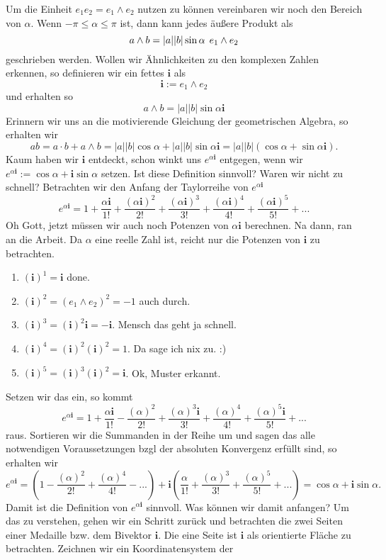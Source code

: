 \documentclass[fleqn]{scrartcl}
\numberwithin{equation}{section}
\def\*#1{\mathbf{#1}}
\begin{document}
Um die Einheit $e_1e_2 = e_1\wedge e_2$ nutzen zu können vereinbaren wir noch
den Bereich von $\alpha$. Wenn $-\pi\leq\alpha\leq\pi$ ist, dann kann jedes
äußere Produkt als
\[a\wedge b= |a||b|\sin\alpha \hspace{1ex} e_1\wedge e_2\]
geschrieben werden. Wollen wir Ähnlichkeiten zu den komplexen Zahlen erkennen,
so definieren wir ein fettes $\*i$ als
\[\*i:= e_1\wedge e_2\]
und erhalten so
\[a\wedge b= |a||b|\sin\alpha\*i\]
Erinnern wir uns an die motivierende Gleichung der geometrischen Algebra, so
erhalten wir
\[ab=a\cdot b + a\wedge b = |a||b|\cos\alpha + |a||b|\sin\alpha\*i =
|a||b|(\cos\alpha + \sin\alpha\*i).\]
Kaum haben wir $\*i$ entdeckt, schon winkt uns $e^{\alpha\*i}$ entgegen, wenn
wir $e^{\alpha\*i} := \cos\alpha + \*i\sin\alpha$ setzen. Ist diese Definition
sinnvoll? Waren wir nicht zu schnell? Betrachten wir den Anfang der
Taylorreihe von $e^{\alpha\*i}$
\[e^{\alpha\*i}=1+\frac{\alpha\*i}{1!}+\frac{(\alpha\*i)^2}{2!}
+\frac{(\alpha\*i)^3}{3!}+\frac{(\alpha\*i)^4}{4!}+\frac{(\alpha\*i)^5}{5!}+ ...\]
Oh Gott, jetzt müssen wir auch noch Potenzen von $\alpha\*i$ berechnen. Na
dann, ran an die Arbeit. Da $\alpha$ eine reelle Zahl ist, reicht nur die
Potenzen von $\*i$ zu betrachten.
\begin{enumerate}
    \item $(\*i)^1=\*i$ done.
    \item $(\*i)^2=(e_1\wedge e_2)^2=-1$ auch durch.
    \item $(\*i)^3 = (\*i)^2\*i = -\*i$. Mensch das geht ja schnell.
    \item $(\*i)^4=(\*i)^2(\*i)^2=1$. Da sage ich nix zu. :)
    \item $(\*i)^5=(\*i)^3(\*i)^2=\*i$. Ok, Muster erkannt.
\end{enumerate}
Setzen wir das ein, so kommt
\[e^{\alpha\*i}=1+\frac{\alpha\*i}{1!}-\frac{(\alpha)^2}{2!}
+\frac{(\alpha)^3\*i}{3!}+\frac{(\alpha)^4}{4!}+\frac{(\alpha)^5\*i}{5!}+ ...\]
raus. Sortieren wir die Summanden in der Reihe um und sagen das alle
notwendigen Voraussetzungen bzgl der absoluten Konvergenz erfüllt sind, so
erhalten wir
\[e^{\alpha\*i}=\left(1-\frac{(\alpha)^2}{2!}+\frac{(\alpha)^4}{4!}-...\right)
+\*i\left(\frac{\alpha}{1!}+\frac{(\alpha)^3}{3!}+\frac{(\alpha)^5}{5!}+
...\right)=\cos\alpha+\*i\sin\alpha.\]
Damit ist die Definition von $e^{\alpha\*i}$ sinnvoll. Was können wir damit
anfangen? Um das zu verstehen, gehen wir ein Schritt zurück und betrachten die
zwei Seiten einer Medaille bzw. dem Bivektor $\*i$. Die eine Seite ist $\*i$
als orientierte Fläche zu betrachten. Zeichnen wir ein Koordinatensystem der
\end{document}
